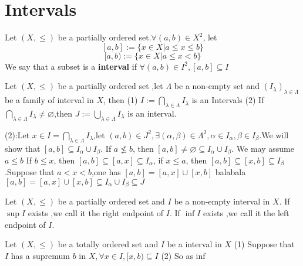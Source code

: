 \documentclass{book}
\begin{document}
\section{Intervals}

\begin{definitionenv}
    Let $(X,\le)$ be a partially ordered set.$\forall (a,b)\in X^2$, let $$[a,b]:=\{x\in X|a\le x\le b \}$$ $$[a,b):=\{x\in X|a\le x <b\}$$ We say that a subset is a \textbf{interval} if $\forall (a,b)\in I^2 ,[a,b]\subseteq I$
\end{definitionenv}
\begin{propositionenv}
    Let $(X,\le)$ be a partially ordered set ,let $\Lambda$ be a non-empty set and $(I_\lambda)_{\lambda\in \Lambda}$ be a family of interval in $X$, then 
    \newline
    (1) $\displaystyle I:=\bigcap _{\lambda\in \Lambda}I_\lambda$ is an Intervals
    \newline
    (2) If $\displaystyle \bigcap _{\lambda\in \Lambda}I_\lambda\not=\varnothing $,then $\displaystyle J:=\bigcup_{\lambda\in \Lambda}I_\lambda$ is an interval.
\end{propositionenv}
\begin{proofenv}
    (2):Let $x\in I=\bigcap _{\lambda\in \Lambda}I_\lambda$,let $(a,b)\in J^2,\exists (\alpha,\beta )\in \Lambda^2,\alpha\in I_\alpha,\beta\in I_\beta$.We will show that $[a,b]\subseteq I_\alpha\cup I_\beta$. If $a\not\le b $, then $[a,b]\not =\varnothing\subseteq I_\alpha\cup I_\beta $. We may assume $a\le b $
    \newline 
    If $b\le x$, then $[a,b]\subseteq [a,x]\subseteq I_\alpha$, if $x\le a $, then $[a,b]\subseteq [x,b]\subseteq I_\beta$.Suppose that $a<x<b$,one has $[a,b]=[a,x]\cup[x,b]$ balabala $[a,b]=[a,x]\cup[x,b]\subseteq I_\alpha\cup I_\beta \subseteq J$

\end{proofenv}
\begin{definitionenv}
    Let $(X,\le )$ be a partially ordered set and $I $ be a non-empty interval in $X$. 
    \newline
    If $\sup I$ exists ,we call it the right endpoint of $I$.
    \newline
    If $\inf I$ exists ,we call it the left endpoint of $I$.
\end{definitionenv}
\begin{propositionenv}
   Let $(X,\le )$ be a totally ordered set and $I $ be a interval in $X$ 
   \newline
   (1) Suppose that $I$ has a supremum $b$ in $X,\forall x\in I,[x,b)\subseteq I$
   \newline
   (2) So as inf
\end{propositionenv}
\end{document}
